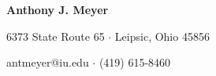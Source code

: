 %
\begin{singlespace}
\centerline{\textbf{\Large Anthony J. Meyer}}
\smallskip 
\centerline{\small 6373 State Route 65 $\cdot$ Leipsic, Ohio 45856 }
\centerline{\small antmeyer@iu.edu $\cdot$ (419) 615-8460 }


\vspace{16pt}
%

\end{singlespace}
